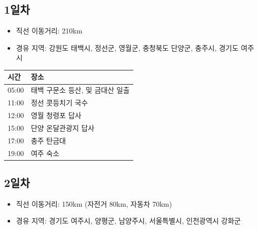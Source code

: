 \documentclass[chapter, oneside]{oblivoir}
\begin{document}
\subsection{1일차}
\begin{itemize}
    \item 직선 이동거리: 210km
    \item 경유 지역: 강원도 태백시, 정선군, 영월군, 충청북도 단양군, 충주시, 경기도 여주시
\end{itemize}


\begin{table}[ht]
    \begin{center}    
    \begin{tabular}{rl}
    \multicolumn{1}{l}{시간}     & \multicolumn{1}{l}{장소} \\ \hline
    \multicolumn{1}{r|}{05:00} & 태백 구문소 등산, 및 금대산   일출 \\
    \multicolumn{1}{r|}{11:00} & 정선 콧등치기   국수          \\
    \multicolumn{1}{r|}{12:00} & 영월 청령포 답사             \\
    \multicolumn{1}{r|}{15:00} & 단양   온달관광지 답사         \\
    \multicolumn{1}{r|}{17:00} & 충주   탄금대              \\
    \multicolumn{1}{r|}{19:00} & 여주   숙소              
    \end{tabular}
    \end{center}
\end{table}
\subsection{2일차}
\begin{itemize}
    \item 직선 이동거리: 150km (자전거 80km, 자동차 70km)
    \item 경유 지역: 경기도 여주시, 양평군, 남양주시, 서울특별시, 인천광역시 강화군
\end{itemize}
\end{document}
